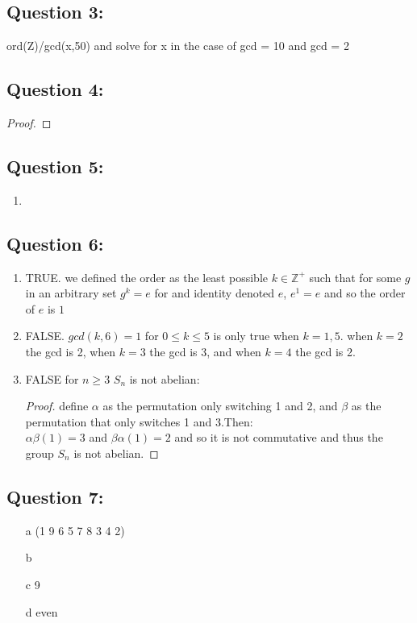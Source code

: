 \documentclass[12pt]{article}
\begin{document}
	\subsection*{Question 3:}
	ord(Z)/gcd(x,50) and solve for x in the case of gcd = 10 and gcd = 2
\newpage
	\subsection*{Question 4:}
	\begin{proof}
	\end{proof}
	\newpage
	\subsection*{Question 5:}
	\begin{enumerate}
		\item 
	\end{enumerate}
	\newpage
	\subsection*{Question 6:}
	\begin{enumerate}
		\item TRUE. we defined the order as the least possible $k\in\mathbb{Z^+}$ such that for some $g$ in an arbitrary set $g^k=e$ for and identity denoted $e$, $e^1=e$ and so the order of $e$ is $1$
		\item FALSE. $gcd(k,6)=1$ for $0\le k\le 5$ is only true when $k=1,5$. when $k=2$ the gcd is 2, when $k=3$ the gcd is 3, and when $k=4$ the gcd is 2.
		\item FALSE for $n\ge3$ $S_n$ is not abelian:
		\begin{proof}
			define $\alpha$ as the permutation only switching 1 and 2, and $\beta$ as the permutation that only switches 1 and 3.Then:\\
			$\alpha\beta(1)=3$ and $\beta\alpha(1)=2$ and so it is not commutative and thus the group $S_n$ is not abelian. 	
		\end{proof}
	\end{enumerate}
	\newpage
	\subsection*{Question 7:}
	\begin{enumerate}
		\item[a] (1 9 6 5 7 8 3 4 2)
		\item[b]
		\item[c] 9
		\item[d] even
	\end{enumerate}
\end{document}
